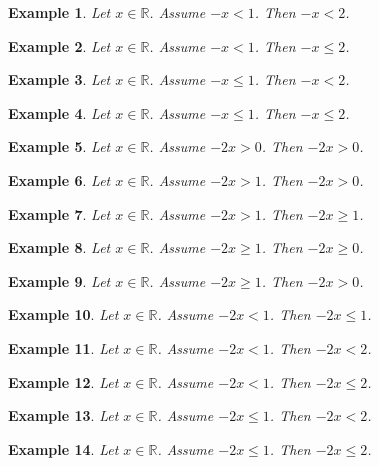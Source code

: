 \documentclass{article}
\newtheorem{example}{Example}
\begin{document}
\begin{example}
Let $x\in\mathbb{R}$. Assume $-x<1$. Then $-x<2$.
\end{example}

\begin{example}
Let $x\in\mathbb{R}$. Assume $-x<1$. Then $-x\le 2$.
\end{example}

\begin{example}
Let $x\in\mathbb{R}$. Assume $-x\le 1$. Then $-x<2$.
\end{example}

\begin{example}
Let $x\in\mathbb{R}$. Assume $-x\le 1$. Then $-x\le 2$.
\end{example}


\begin{example}
Let $x\in\mathbb{R}$. Assume $-2x>0$. Then $-2x>0$.
\end{example}

\begin{example}
Let $x\in\mathbb{R}$. Assume $-2x>1$. Then $-2x>0$.
\end{example}

\begin{example}
Let $x\in\mathbb{R}$. Assume $-2x>1$. Then $-2x\ge 1$.
\end{example}

\begin{example}
Let $x\in\mathbb{R}$. Assume $-2x\ge 1$. Then $-2x\ge 0$.
\end{example}

\begin{example}
Let $x\in\mathbb{R}$. Assume $-2x\ge 1$. Then $-2x> 0$.
\end{example}

\begin{example}
Let $x\in\mathbb{R}$. Assume $-2x<1$. Then $-2x\le 1$.
\end{example}

\begin{example}
Let $x\in\mathbb{R}$. Assume $-2x<1$. Then $-2x<2$.
\end{example}

\begin{example}
Let $x\in\mathbb{R}$. Assume $-2x<1$. Then $-2x\le 2$.
\end{example}

\begin{example}
Let $x\in\mathbb{R}$. Assume $-2x\le 1$. Then $-2x<2$.
\end{example}

\begin{example}
Let $x\in\mathbb{R}$. Assume $-2x\le 1$. Then $-2x\le 2$.
\end{example}
\end{document}

